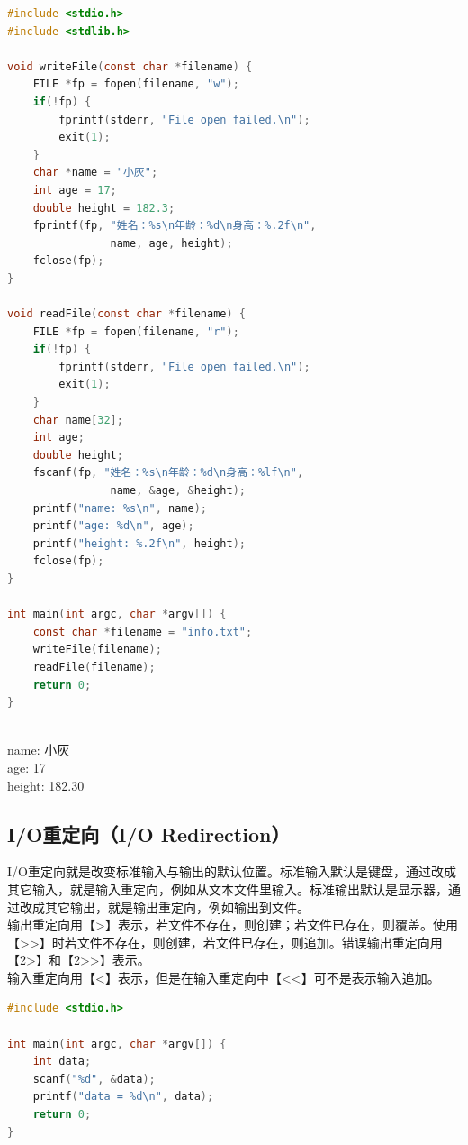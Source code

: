 \vspace{0.5cm}
\begin{lstlisting}[language=C]
#include <stdio.h>
#include <stdlib.h>

void writeFile(const char *filename) {
    FILE *fp = fopen(filename, "w");
    if(!fp) {
        fprintf(stderr, "File open failed.\n");
        exit(1);
    }
    char *name = "小灰";
    int age = 17;
    double height = 182.3;
    fprintf(fp, "姓名：%s\n年龄：%d\n身高：%.2f\n", 
                name, age, height);
    fclose(fp);
}

void readFile(const char *filename) {
    FILE *fp = fopen(filename, "r");
    if(!fp) {
        fprintf(stderr, "File open failed.\n");
        exit(1);
    }
    char name[32];
    int age;
    double height;
    fscanf(fp, "姓名：%s\n年龄：%d\n身高：%lf\n", 
                name, &age, &height);
    printf("name: %s\n", name);
    printf("age: %d\n", age);
    printf("height: %.2f\n", height);
    fclose(fp);
}

int main(int argc, char *argv[]) {
    const char *filename = "info.txt";
    writeFile(filename);
    readFile(filename);
    return 0;
}
\end{lstlisting}

\begin{tcolorbox}
	 \\
	name: 小灰 \\
	age: 17 \\
	height: 182.30
\end{tcolorbox}

\subsection{I/O重定向（I/O Redirection）}

I/O重定向就是改变标准输入与输出的默认位置。标准输入默认是键盘，通过改成其它输入，就是输入重定向，例如从文本文件里输入。标准输出默认是显示器，通过改成其它输出，就是输出重定向，例如输出到文件。 \\

输出重定向用【>】表示，若文件不存在，则创建；若文件已存在，则覆盖。使用【>>】时若文件不存在，则创建，若文件已存在，则追加。错误输出重定向用【2>】和【2>>】表示。 \\

输入重定向用【<】表示，但是在输入重定向中【<<】可不是表示输入追加。 \\

\begin{lstlisting}[language=C]
#include <stdio.h>

int main(int argc, char *argv[]) {
    int data;
    scanf("%d", &data);
    printf("data = %d\n", data);
    return 0;
}
\end{lstlisting}

